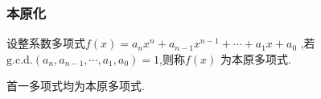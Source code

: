 \subsubsection{本原化}
\begin{formal}
\begin{definition}[本原多项式]\label{def:本原多项式}
    设整系数多项式$f\left(x\right)=a_nx^n+a_{n-1}x^{n-1}+\cdots+a_1x+a_0$
    ,若$\mathrm{g.c.d.}\left(a_n,a_{n-1},
    \cdots,a_1,a_0\right)=1$,则称$f\left(x\right)$
    为本原多项式.
\end{definition}
\end{formal}
\begin{brown}
\begin{example}
    首一多项式均为本原多项式.
\end{example}
\end{brown}
